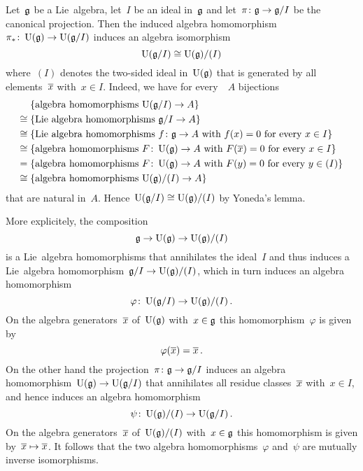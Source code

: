 \begin{example}
  Let~$\mathfrak{g}$ be a Lie~algebra, let~$I$ be an ideal in~$\mathfrak{g}$ and let~$\pi \colon \mathfrak{g} \to \mathfrak{g}/I$ be the canonical projection.
  Then the induced algebra homomorphism~$\pi_* \colon \operatorname{U}(\mathfrak{g}) \to \operatorname{U}(\mathfrak{g}/I)$ induces an algebra isomorphism
  \[
    \operatorname{U}(\mathfrak{g}/I)
    \cong
    \operatorname{U}(\mathfrak{g})/(I)
  \]
  where~$(I)$ denotes the two-sided ideal in~$\operatorname{U}(\mathfrak{g})$ that is generated by all elements~$\overline{x}$ with~$x \in I$.
  Indeed, we have for every~{\algebra{$\kf$}}~$A$ bijections
  \begin{align*}
    {}&
    \{ \text{algebra homomorphisms~$\operatorname{U}(\mathfrak{g}/I) \to A$} \}
    \\
    \cong{}&
    \{ \text{Lie~algebra homomorphisms~$\mathfrak{g}/I \to A$} \}
    \\
    \cong{}&
    \{ \text{Lie~algebra homomorphisms~$f \colon \mathfrak{g} \to A$ with~$f(x) = 0$ for every~$x \in I$} \}
    \\
    \cong{}&
    \{ \text{algebra homomorphisms~$F \colon \operatorname{U}(\mathfrak{g}) \to A$ with~$F(\overline{x}) = 0$ for every~$x \in I$} \}
    \\
    ={}&
    \{ \text{algebra homomorphisms~$F \colon \operatorname{U}(\mathfrak{g}) \to A$ with~$F(y) = 0$ for every~$y \in (I)$} \}
    \\
    \cong{}&
    \{ \text{algebra homomorphisms~$\operatorname{U}(\mathfrak{g})/(I) \to A$} \}
  \end{align*}
  that are natural in~$A$.
  Hence~$\operatorname{U}(\mathfrak{g}/I) \cong \operatorname{U}(\mathfrak{g})/(I)$ by Yoneda’s lemma.
  
  More explicitely, the composition
  \[
    \mathfrak{g}
    \to
    \operatorname{U}(\mathfrak{g})
    \to
    \operatorname{U}(\mathfrak{g})/(I)
  \]
  is a Lie~algebra homomorphisms that annihilates the ideal~$I$ and thus induces a Lie~algebra homomorphism~$\mathfrak{g}/I \to \operatorname{U}(\mathfrak{g})/(I)$, which in turn induces an algebra homomorphism
  \[
    \varphi
    \colon
    \operatorname{U}(\mathfrak{g}/I)
    \to
    \operatorname{U}(\mathfrak{g})/(I)  \,.
  \]
  On the algebra generators~$\overline{x}$ of~$\operatorname{U}(\mathfrak{g})$ with~$x \in \mathfrak{g}$ this homomorphism~$\varphi$ is given by
  \[
    \varphi(\overline{x})
    =
    \overline{x} \,.
  \]
  On the other hand the projection~$\pi \colon \mathfrak{g} \to \mathfrak{g}/I$ induces an algebra homomorphism~$\operatorname{U}(\mathfrak{g}) \to \operatorname{U}(\mathfrak{g}/I)$ that annihilates all residue classes~$\overline{x}$ with~$x \in I$, and hence induces an algebra homomorphism
  \[
    \psi
    \colon
    \operatorname{U}(\mathfrak{g})/(I)
    \to
    \operatorname{U}(\mathfrak{g}/I)  \,.
  \]
  On the algebra generators~$\overline{x}$ of~$\operatorname{U}(\mathfrak{g})/(I)$ with~$x \in \mathfrak{g}$ this homomorphism is given by~$\overline{x} \mapsto \overline{x}$.
  It follows that the two algebra homomorphisms~$\varphi$ and~$\psi$ are mutually inverse isomorphisms.
\end{example}


